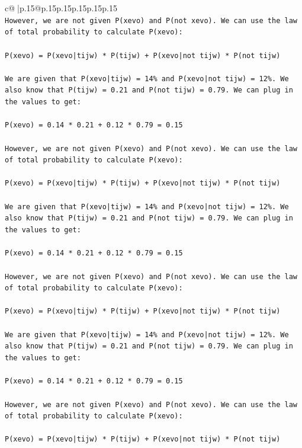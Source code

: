 \documentclass{article}
\begin{document}
{\begin{supertabular}{c@{$\;$}|p{.15\linewidth}@{}p{.15\linewidth}p{.15\linewidth}p{.15\linewidth}p{.15\linewidth}p{.15\linewidth}}
{{{\\ 
\texttt{However, we are not given P(xevo) and P(not xevo). We can use the law of total probability to calculate P(xevo):} \\
\\ 
\texttt{P(xevo) = P(xevo|tijw) * P(tijw) + P(xevo|not tijw) * P(not tijw)} \\
\\ 
\texttt{We are given that P(xevo|tijw) = 14\% and P(xevo|not tijw) = 12\%. We also know that P(tijw) = 0.21 and P(not tijw) = 0.79. We can plug in the values to get:} \\
\\ 
\texttt{P(xevo) = 0.14 * 0.21 + 0.12 * 0.79 = 0.15} \\
\\ 
\texttt{However, we are not given P(xevo) and P(not xevo). We can use the law of total probability to calculate P(xevo):} \\
\\ 
\texttt{P(xevo) = P(xevo|tijw) * P(tijw) + P(xevo|not tijw) * P(not tijw)} \\
\\ 
\texttt{We are given that P(xevo|tijw) = 14\% and P(xevo|not tijw) = 12\%. We also know that P(tijw) = 0.21 and P(not tijw) = 0.79. We can plug in the values to get:} \\
\\ 
\texttt{P(xevo) = 0.14 * 0.21 + 0.12 * 0.79 = 0.15} \\
\\ 
\texttt{However, we are not given P(xevo) and P(not xevo). We can use the law of total probability to calculate P(xevo):} \\
\\ 
\texttt{P(xevo) = P(xevo|tijw) * P(tijw) + P(xevo|not tijw) * P(not tijw)} \\
\\ 
\texttt{We are given that P(xevo|tijw) = 14\% and P(xevo|not tijw) = 12\%. We also know that P(tijw) = 0.21 and P(not tijw) = 0.79. We can plug in the values to get:} \\
\\ 
\texttt{P(xevo) = 0.14 * 0.21 + 0.12 * 0.79 = 0.15} \\
\\ 
\texttt{However, we are not given P(xevo) and P(not xevo). We can use the law of total probability to calculate P(xevo):} \\
\\ 
\texttt{P(xevo) = P(xevo|tijw) * P(tijw) + P(xevo|not tijw) * P(not tijw)} \\
}}}
\end{supertabular}}
\end{document}
